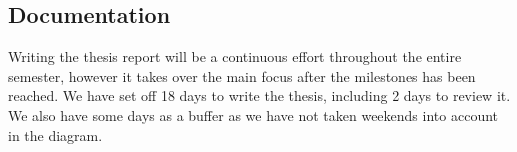 \subsection{Documentation}
Writing the thesis report will be a continuous effort throughout the entire semester,
however it takes over the main focus after the milestones has been reached.
We have set off 18 days to write the thesis, including 2 days to review it.
We also have some days as a buffer as we have not taken weekends into account in the diagram.
